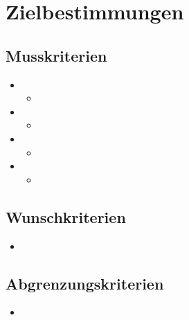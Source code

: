 \section{Zielbestimmungen}

\comment{}

\textbf{}

\subsection{Musskriterien}

\begin{itemize}
  \item
    \begin{itemize}
      \item
    \end{itemize}
  \item
    \begin{itemize}
      \item
    \end{itemize}
  \item
    \begin{itemize}
      \item
    \end{itemize}
  \item 
    \begin{itemize}
      \item
    \end{itemize}
\end{itemize}

\subsection{Wunschkriterien}

\begin{itemize}
  \item
\end{itemize}

\subsection{Abgrenzungskriterien}

\begin{itemize}
  \item
\end{itemize}
